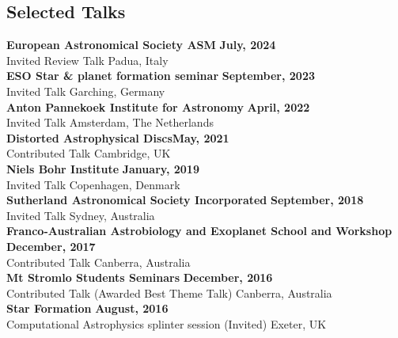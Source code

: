 \documentclass[margin,line]{res}
\begin{document}
\begin{resume}
		\section{\sc Selected Talks}
            {\bf European Astronomical Society ASM} \hfill {\bf July, 2024}\\
		Invited Review Talk \hfill Padua, Italy\\
            {\bf ESO Star \& planet formation seminar} \hfill {\bf September, 2023}\\
		Invited Talk \hfill Garching, Germany\\
		{\bf Anton Pannekoek Institute for Astronomy} \hfill {\bf April, 2022}\\
		Invited Talk \hfill Amsterdam, The Netherlands\\
		{\bf Distorted Astrophysical Discs}\hfill {\bf May, 2021}\\
		Contributed Talk \hfill Cambridge, UK\\
		{\bf Niels Bohr Institute} \hfill {\bf January, 2019}\\
		Invited Talk \hfill Copenhagen, Denmark\\
		{\bf Sutherland Astronomical Society Incorporated} \hfill {\bf September, 2018}\\
		Invited Talk \hfill Sydney, Australia\\
		{\bf Franco-Australian Astrobiology and Exoplanet School and Workshop} \hfill {\bf December, 2017}\\
		Contributed Talk \hfill Canberra, Australia\\
		{\bf Mt Stromlo Students Seminars} \hfill {\bf December, 2016}\\
		Contributed Talk (Awarded Best Theme Talk) \hfill Canberra, Australia\\
		{\bf Star Formation} \hfill {\bf August, 2016}\\
		Computational Astrophysics splinter session (Invited) \hfill Exeter, UK
		

\end{resume}
\end{document}
